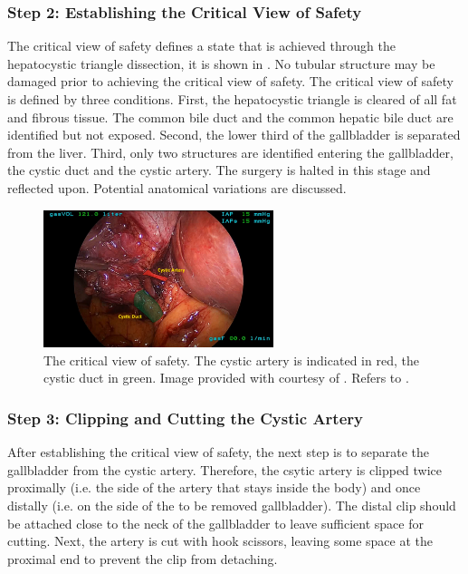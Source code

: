 \subsubsection{Step 2: Establishing the Critical View of Safety} The critical view of safety defines a state that is achieved through the hepatocystic triangle dissection, it is shown in . No tubular structure may be damaged prior to achieving the critical view of safety. The critical view of safety is defined by three conditions. First, the hepatocystic triangle is cleared of all fat and fibrous tissue. The common bile duct and the common hepatic bile duct are identified but not exposed. Second, the lower third of the gallbladder is separated from the liver. Third, only two structures are identified entering the gallbladder, the cystic duct and the cystic artery. The surgery is halted in this stage and reflected upon. Potential anatomical variations are discussed.

\begin{figure}[tb]
    \centering
    \includegraphics[width=0.6\textwidth]{introduction/img/critical_view_of_safety.png}
    \caption{The critical view of safety. The cystic artery is indicated in red, the cystic duct in green. Image provided with courtesy of \cite{ALES5766}. Refers to .}
    \label{fig:enter-label}
\end{figure}

\subsubsection{Step 3: Clipping and Cutting the Cystic Artery} After establishing the critical view of safety, the next step is to separate the gallbladder from the cystic artery. Therefore, the csytic artery is clipped twice proximally (i.e. the side of the artery that stays inside the body) and once distally (i.e. on the side of the to be removed gallbladder). The distal clip should be attached close to the neck of the gallbladder to leave sufficient space for cutting. Next, the artery is cut with hook scissors, leaving some space at the proximal end to prevent the clip from detaching.

